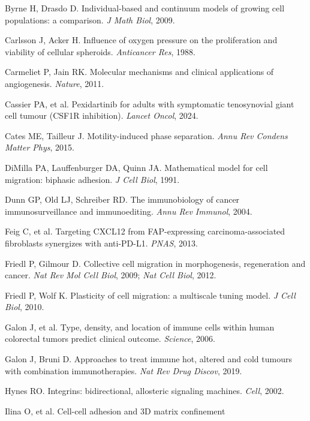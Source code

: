 \documentclass[11pt,letterpaper]{article}
\begin{document}
\begin{enumerate}[label={[\arabic*]}, leftmargin=*, itemsep=0pt]
  \item Byrne H, Drasdo D. Individual-based and continuum models of
        growing cell populations: a comparison. \emph{J Math Biol}, 2009.
  \item Carlsson J, Acker H. Influence of oxygen pressure on the
        proliferation and viability of cellular spheroids.
        \emph{Anticancer Res}, 1988.
  \item Carmeliet P, Jain RK. Molecular mechanisms and clinical
        applications of angiogenesis. \emph{Nature}, 2011.
  \item Cassier PA, et al. Pexidartinib for adults with symptomatic
        tenosynovial giant cell tumour (CSF1R inhibition).
        \emph{Lancet Oncol}, 2024.
  \item Cates ME, Tailleur J. Motility-induced phase separation.
        \emph{Annu Rev Condens Matter Phys}, 2015.
  \item DiMilla PA, Lauffenburger DA, Quinn JA. Mathematical model for
        cell migration: biphasic adhesion. \emph{J Cell Biol}, 1991.
  \item Dunn GP, Old LJ, Schreiber RD. The immunobiology of cancer
        immunosurveillance and immunoediting. \emph{Annu Rev Immunol},
        2004.
  \item Feig C, et al. Targeting CXCL12 from FAP-expressing
        carcinoma-associated fibroblasts synergizes with anti-PD-L1.
        \emph{PNAS}, 2013.
  \item Friedl P, Gilmour D. Collective cell migration in morphogenesis,
        regeneration and cancer. \emph{Nat Rev Mol Cell Biol}, 2009;
        \emph{Nat Cell Biol}, 2012.
  \item Friedl P, Wolf K. Plasticity of cell migration: a multiscale
        tuning model. \emph{J Cell Biol}, 2010.
  \item Galon J, et al. Type, density, and location of immune cells
        within human colorectal tumors predict clinical outcome.
        \emph{Science}, 2006.
  \item Galon J, Bruni D. Approaches to treat immune hot, altered and
        cold tumours with combination immunotherapies.
        \emph{Nat Rev Drug Discov}, 2019.
  \item Hynes RO. Integrins: bidirectional, allosteric signaling
        machines. \emph{Cell}, 2002.
  \item Ilina O, et al. Cell-cell adhesion and 3D matrix confinement

\end{enumerate}
\end{document}

